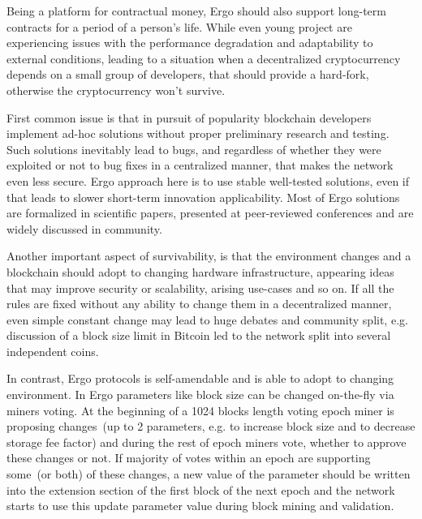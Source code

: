 \documentclass[]{article}
\begin{document}
    Being a platform for contractual money, Ergo should also support long-term contracts for a
    period of a person's life.
    While even young project are experiencing issues with the performance degradation and
    adaptability to external conditions, leading to a situation when a decentralized cryptocurrency
    depends on a small group of developers, that should provide a hard-fork, otherwise the cryptocurrency
    won't survive.

    First common issue is that in pursuit of popularity blockchain developers implement ad-hoc
    solutions without proper preliminary research and testing.
    Such solutions inevitably lead to bugs, and regardless of whether they were exploited or not
    to bug fixes in a centralized manner, that makes the network even less secure.
    Ergo approach here is to use stable well-tested solutions, even if that leads to slower
    short-term innovation applicability.
    Most of Ergo solutions are formalized in scientific papers, presented at peer-reviewed conferences
    and are widely discussed in community.


    Another important aspect of survivability, is that the environment changes and a blockchain should
    adopt to changing hardware infrastructure, appearing ideas that may improve security or
    scalability, arising use-cases and so on.
    If all the rules are fixed without any ability to change them in a decentralized manner, even
    simple constant change may lead to huge debates and community split, e.g. discussion of a block
    size limit in Bitcoin led to the network split into several independent coins.

    In contrast, Ergo protocols is self-amendable and is able to adopt to changing environment.
    In Ergo parameters like block size can be changed on-the-fly via miners voting.
    At the beginning of a 1024 blocks length voting epoch miner is proposing changes~(up to 2 parameters,
    e.g. to increase block size and to decrease storage fee factor) and during the rest of epoch miners
    vote, whether to approve these changes or not.
    If majority of votes within an epoch are supporting some~(or both) of these changes, a new value of the
    parameter should be written into the extension section of the first block of the next epoch and the
    network starts to use this update parameter value during block mining and validation.
\end{document}
